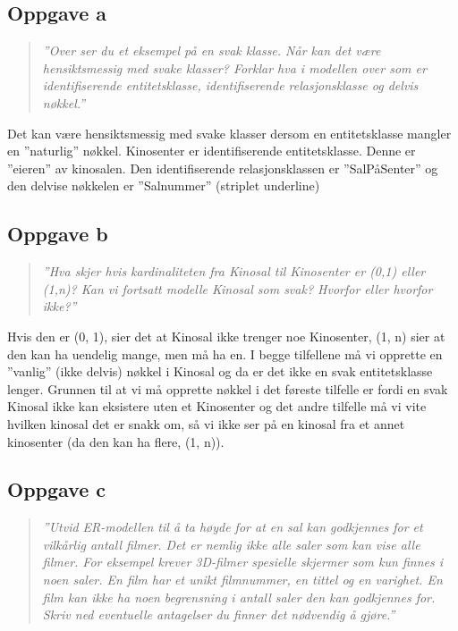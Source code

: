 \documentclass[12pt,a4paper]{article}
\begin{document}
		\subsection{Oppgave a}
			\begin{quote}
				\textit{
				''Over ser du et eksempel på en svak klasse. Når kan det være hensiktsmessig med
				svake klasser? Forklar hva i modellen over som er identifiserende entitetsklasse,
				identifiserende relasjonsklasse og delvis nøkkel.''			
				}
			\end{quote}						
			
			Det kan være hensiktsmessig med svake klasser dersom en entitetsklasse mangler en ''naturlig'' nøkkel. Kinosenter er identifiserende 									entitetsklasse. Denne er ''eieren'' av kinosalen. Den identifiserende relasjonsklassen er ''SalPåSenter'' og den delvise nøkkelen er ''Salnummer'' 					(striplet underline)
			
		\subsection{Oppgave b}
			\begin{quote}
				\textit{
					''Hva skjer hvis kardinaliteten fra Kinosal til Kinosenter er (0,1) eller (1,n)? Kan vi
					fortsatt modelle Kinosal som svak? Hvorfor eller hvorfor ikke?''				
				}
			\end{quote}
			
			Hvis den er (0, 1), sier det at Kinosal ikke trenger noe Kinosenter, (1, n) sier at den kan ha uendelig mange, men må ha en. I begge tilfellene må vi 					opprette en ''vanlig'' (ikke delvis) nøkkel i Kinosal og da er det ikke en svak entitetsklasse lenger. Grunnen til at vi må opprette nøkkel i det føreste 				tilfelle er fordi en svak Kinosal ikke kan eksistere uten et Kinosenter og det andre tilfelle må vi vite hvilken kinosal det er snakk om, så vi ikke ser på 				en kinosal fra et annet kinosenter (da den kan ha flere, (1, n)).
			
			\subsection{Oppgave c}
				\begin{quote}
					\textit{
						''Utvid ER-modellen til å ta høyde for at en sal kan godkjennes for et vilkårlig antall
						filmer. Det er nemlig ikke alle saler som kan vise alle filmer. For eksempel krever
						3D-filmer spesielle skjermer som kun finnes i noen saler. En film har et unikt
						filmnummer, en tittel og en varighet. En film kan ikke ha noen begrensning i antall
						saler den kan godkjennes for. Skriv ned eventuelle antagelser du finner det
						nødvendig å gjøre.''					
					}
				\end{quote}
				
				
\end{document}

